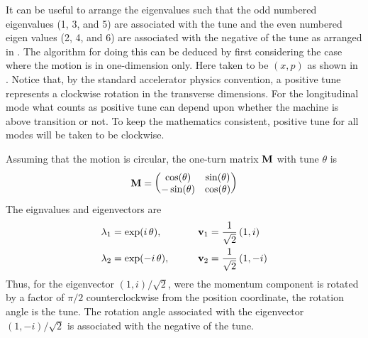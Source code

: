 It can be useful to arrange the eigenvalues such that the odd numbered eigenvalues (1, 3, and 5) are
associated with the tune and the even numbered eigen values (2, 4, and 6) are associated with the
negative of the tune as arranged in . The algorithm for doing this can be deduced by first
considering the case where the motion is in one-dimension only. Here taken to be $(x, p)$ as shown
in . Notice that, by the standard accelerator physics convention, a positive tune
represents a clockwise rotation in the transverse dimensions. For the longitudinal mode what counts
as positive tune can depend upon whether the machine is above transition or not. To keep the
mathematics consistent, positive tune for all modes will be taken to be clockwise.

Assuming that the motion is circular, the one-turn matrix ${\bf M}$ with tune $\theta$ is
\begin{equation}
  {\bf M} = \begin{pmatrix}
    \cos(\theta) & \sin(\theta) \\
   -\sin(\theta) & \cos(\theta)
  \end{pmatrix}
  \label{mctst}
\end{equation}
The eignvalues and eigenvectors are
\begin{alignat}{2}
  \lambda_1 &= \exp( i \, \theta),  \qquad &&{\bf v}_1 = \frac{1}{\sqrt{2}} \, (1, i) \nonumber \\
  \lambda_2 &= \exp(-i \, \theta),  \qquad &&{\bf v}_2 = \frac{1}{\sqrt{2}} \, (1, -i) 
\end{alignat}
Thus, for the eigenvector $(1, i)/\sqrt{2}$, were the momentum component is rotated by a factor
of $\pi/2$ counterclockwise from the position coordinate, the rotation angle is the tune. The
rotation angle associated with the eigenvector $(1, -i)/\sqrt{2}$ is associated with the negative of
the tune.

